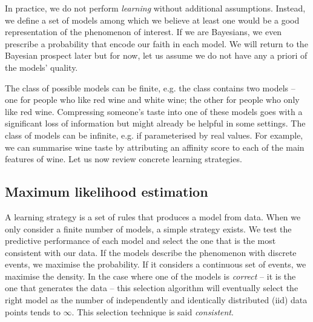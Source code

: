 In practice, we do not perform \textit{learning} without additional assumptions. Instead, we define a set of models among which we believe at least one would be a good representation of the phenomenon of interest. If we are Bayesians, we even prescribe a probability that encode our faith in each model. We will return to the Bayesian prospect later but for now, let us assume we do not have any a priori of the models' quality.

The class of possible models can be finite, e.g. the class contains two models -- one for people who like red wine and white wine; the other for people who only like red wine. Compressing someone's taste into one of these models goes with a significant loss of information but might already be helpful in some settings. The class of models can be infinite, e.g. if parameterised by real values. For example, we can summarise wine taste by attributing an affinity score to each of the main features of wine. Let us now review concrete learning strategies.
\subsection{Maximum likelihood estimation}
A learning strategy is a set of rules that produces a model from data. When we only consider a finite number of models, a simple strategy exists. We test the predictive performance of each model and select the one that is the most consistent with our data. If the models describe the phenomenon with discrete events, we maximise the probability. If it considers a continuous set of events, we maximise the density. In the case where one of the models is \textit{correct} -- it is the one that generates the data -- this selection algorithm will eventually select the right model as the number of independently and identically distributed (iid) data points tends to $\infty$. This selection technique is said \textit{consistent}.


